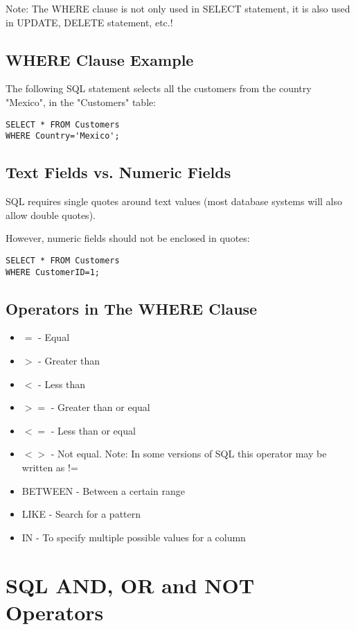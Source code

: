 \documentclass[a4paper,12pt]{article}
\begin{document}
Note: The WHERE clause is not only used in SELECT statement, it is also used in UPDATE, DELETE statement, etc.!


\subsection{WHERE Clause Example}

The following SQL statement selects all the customers from the country "Mexico", in the "Customers" table:


\begin{lstlisting}
SELECT * FROM Customers
WHERE Country='Mexico';
\end{lstlisting}


\subsection{Text Fields vs. Numeric Fields}

SQL requires single quotes around text values (most database systems will also allow double quotes).

However, numeric fields should not be enclosed in quotes:

\begin{lstlisting}
SELECT * FROM Customers
WHERE CustomerID=1;
\end{lstlisting}


\subsection{Operators in The WHERE Clause}

\begin{itemize}
	\item $=$ - Equal
	\item $>$ - Greater than
	\item $<$ - Less than
	\item $>=$ - 	Greater than or equal
	\item $<=$ - Less than or equal
	\item $<>$ - Not equal. Note: In some versions of SQL this operator may be written as !=
	\item BETWEEN - Between a certain range
	\item LIKE - Search for a pattern
	\item IN - To specify multiple possible values for a column
\end{itemize}


\section{SQL AND, OR and NOT Operators}
\end{document}
